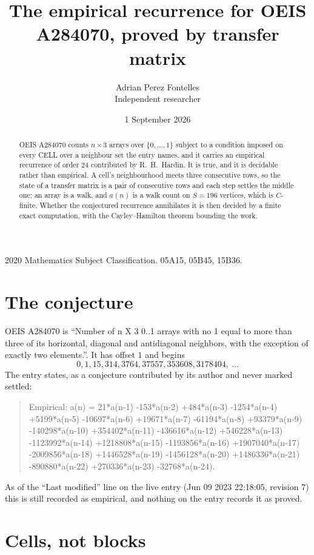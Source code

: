 \documentclass[11pt,a4paper]{article}
\title{The empirical recurrence for OEIS A284070, proved by transfer matrix}
\author{Adrian Perez Fontelles\\ \small Independent researcher}
\date{1 September 2026}
\theoremstyle{plain}
\theoremstyle{definition}
\begin{document}
\maketitle

\begin{abstract}
OEIS A284070 counts $n\times3$ arrays over $\{0,\dots,1\}$ subject to a condition imposed on
every CELL over a neighbour set the entry names, and it carries an empirical recurrence of
order $24$ contributed by R.~H.~Hardin. It is true, and it is decidable rather than
empirical. A cell's neighbourhood meets three consecutive rows, so the state of a transfer
matrix is a pair of consecutive rows and each step settles the middle one; an array is a
walk, and $a(n)$ is a walk count on $S=196$ vertices, which is $C$-finite. Whether the
conjectured recurrence annihilates it is then decided by a finite exact computation, with the
Cayley--Hamilton theorem bounding the work.
\end{abstract}

\noindent\small 2020 Mathematics Subject Classification. 05A15, 05B45, 15B36.\normalsize

\section{The conjecture}

OEIS A284070 is ``Number of n X 3 0..1 arrays with no 1 equal to more than three of its horizontal, diagonal and antidiagonal neighbors, with the exception of exactly two elements.''. It has offset $1$ and begins
\[
0, 1, 15, 314, 3764, 37557, 353608, 3178404,\ \dots
\]
The entry states, as a conjecture contributed by its author and never marked settled:
\begin{quote}
Empirical: a(n) = 21*a(n-1) -153*a(n-2) +484*a(n-3) -1254*a(n-4) +5199*a(n-5) -10697*a(n-6) +19671*a(n-7) -61194*a(n-8) +93379*a(n-9) -140298*a(n-10) +354402*a(n-11) -436616*a(n-12) +546228*a(n-13) -1123992*a(n-14) +1218808*a(n-15) -1193856*a(n-16) +1907040*a(n-17) -2009856*a(n-18) +1446528*a(n-19) -1456128*a(n-20) +1486336*a(n-21) -890880*a(n-22) +270336*a(n-23) -32768*a(n-24).
\end{quote}
As of the ``Last modified'' line on the live entry (Jun 09 2023 22:18:05, revision 7) this is still
recorded as empirical, and nothing on the entry records it as proved.

\section{Cells, not blocks}
\end{document}
